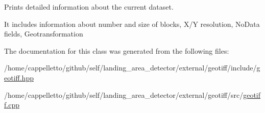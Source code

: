 Prints detailed information about the current dataset. 

It includes information about number and size of blocks, X/Y resolution, No\+Data fields, Geotransformation 

The documentation for this class was generated from the following files\+:\begin{DoxyCompactItemize}
\item 
/home/cappelletto/github/self/landing\+\_\+area\+\_\+detector/external/geotiff/include/\hyperlink{external_2geotiff_2include_2geotiff_8hpp}{geotiff.\+hpp}\item 
/home/cappelletto/github/self/landing\+\_\+area\+\_\+detector/external/geotiff/src/\hyperlink{external_2geotiff_2src_2geotiff_8cpp}{geotiff.\+cpp}\end{DoxyCompactItemize}
